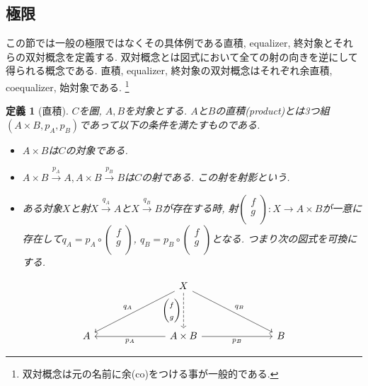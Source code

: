 \documentclass[a4paper,12pt]{ltjsarticle}
\theoremstyle{break}
\newtheorem{defn}[thm]{定義}
\newcommand{\xr}[1]{\xrightarrow{#1}}
\newcommand{\ci}{\circ}
\newcommand{\ti}{\times}
\numberwithin{equation}{section}
\begin{document}
\subsection{極限}

この節では一般の極限ではなくその具体例である直積, equalizer, 終対象とそれらの双対概念を定義する. 
双対概念とは図式において全ての射の向きを逆にして得られる概念である. 
直積, equalizer, 終対象の双対概念はそれぞれ余直積, coequalizer, 始対象である.
\footnote{
  双対概念は元の名前に余(co)をつける事が一般的である.
  }

\begin{defn}[直積]
  $C$を圏, $A, B$を対象とする. 
  $A$と$B$の直積(product)とは3つ組$(A \ti B, p_A, p_B)$であって以下の条件を満たすものである.
  \begin{itemize} 
    \item $A \ti B$は$C$の対象である. 
    \item $A \ti B \xr{p_A} A, A \ti B \xr{p_B} B$は$C$の射である. この射を射影という. 
    \item ある対象$X$と射$X \xr{q_A} A$と$X \xr{q_B} B$が存在する時, 射$\begin{pmatrix} f \\ g \\ \end{pmatrix}: X \to A \ti B$が一意に存在して$q_A = p_A \ci \begin{pmatrix} f \\ g \\ \end{pmatrix}$, $q_B = p_B \ci \begin{pmatrix} f \\ g \\ \end{pmatrix}$となる. 
    つまり次の図式を可換にする. 
  \end{itemize}   
  \[\begin{tikzcd}
	  &&& X \\
	  \\
	  A &&& {A \times B} &&& B
	  \arrow["{q_B}", from=1-4, to=3-7]
	  \arrow["{q_A}"', from=1-4, to=3-1]
	  \arrow["{\begin{pmatrix} f \\ g \\ \end{pmatrix}}"', dashed, from=1-4, to=3-4]
	  \arrow["{p_A}", from=3-4, to=3-1]
	  \arrow["{p_B}"', from=3-4, to=3-7]
  \end{tikzcd}\]
\end{defn}
\end{document}
